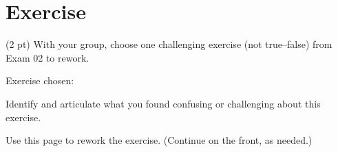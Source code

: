%
%
%
%

\section{Exercise}

(2 pt) With your group, choose one challenging exercise (not true--false) from Exam 02 to rework.

\vspace{0.25in}

\noindent{}Exercise chosen:

\vspace{0.25in}

\noindent{}Identify and articulate what you found confusing or challenging about this exercise.

\vspace{1in}

\noindent{}Use this page to rework the exercise. (Continue on the front, as needed.)